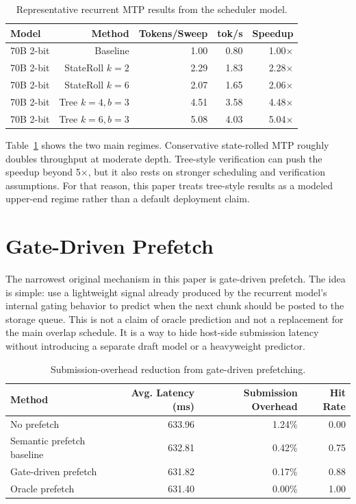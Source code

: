 \documentclass[11pt]{article}
\begin{document}
\begin{table}[t]
\centering
\caption{Representative recurrent MTP results from the scheduler model.}
\label{tab:mtp}
\begin{tabular}{lrrrr}
\toprule
Model & Method & Tokens/Sweep & tok/s & Speedup \\
\midrule
70B 2-bit & Baseline & 1.00 & 0.80 & 1.00$\times$ \\
70B 2-bit & StateRoll $k=2$ & 2.29 & 1.83 & 2.28$\times$ \\
70B 2-bit & StateRoll $k=6$ & 2.07 & 1.65 & 2.06$\times$ \\
70B 2-bit & Tree $k=4, b=3$ & 4.51 & 3.58 & 4.48$\times$ \\
70B 2-bit & Tree $k=6, b=3$ & 5.08 & 4.03 & 5.04$\times$ \\
\bottomrule
\end{tabular}
\end{table}

Table~\ref{tab:mtp} shows the two main regimes. Conservative state-rolled MTP roughly doubles throughput at moderate depth. Tree-style verification can push the speedup beyond 5$\times$, but it also rests on stronger scheduling and verification assumptions. For that reason, this paper treats tree-style results as a modeled upper-end regime rather than a default deployment claim.

\section{Gate-Driven Prefetch}
The narrowest original mechanism in this paper is gate-driven prefetch. The idea is simple: use a lightweight signal already produced by the recurrent model's internal gating behavior to predict when the next chunk should be posted to the storage queue. This is not a claim of oracle prediction and not a replacement for the main overlap schedule. It is a way to hide host-side submission latency without introducing a separate draft model or a heavyweight predictor.

\begin{table}[t]
\centering
\caption{Submission-overhead reduction from gate-driven prefetching.}
\label{tab:prefetch}
\begin{tabular}{lrrr}
\toprule
Method & Avg. Latency (ms) & Submission Overhead & Hit Rate \\
\midrule
No prefetch & 633.96 & 1.24\% & 0.00 \\
Semantic prefetch baseline & 632.81 & 0.42\% & 0.75 \\
Gate-driven prefetch & 631.82 & 0.17\% & 0.88 \\
Oracle prefetch & 631.40 & 0.00\% & 1.00 \\
\bottomrule
\end{tabular}
\end{table}
\end{document}
